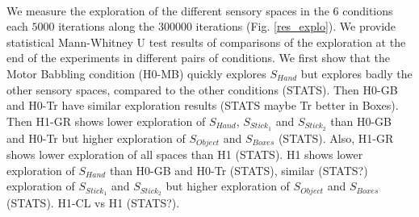 \documentclass[10pt,letterpaper]{article}
\begin{document}
	\paragraph{}
	We measure the exploration of the different sensory spaces in the $6$ conditions each $5000$ iterations along the $300000$ iterations (Fig. \ref{res_explo}).
	We provide statistical Mann-Whitney U test results of comparisons of the exploration at the end of the experiments in different pairs of conditions.
	We first show that the Motor Babbling condition (H0-MB) quickly explores $S_{Hand}$ but explores badly the other sensory spaces, compared to the other conditions (STATS).
	Then H0-GB and H0-Tr have similar exploration results (STATS maybe Tr better in Boxes).
	Then H1-GR shows lower exploration of $S_{Hand}$, $S_{Stick_1}$ and $S_{Stick_2}$ than H0-GB and H0-Tr but higher exploration of $S_{Object}$ and $S_{Boxes}$ (STATS).
	Also, H1-GR shows lower exploration of all spaces than H1 (STATS).
	H1 shows lower exploration of $S_{Hand}$ than H0-GB and H0-Tr (STATS), similar (STATS?) exploration of $S_{Stick_1}$ and $S_{Stick_2}$ but higher exploration of $S_{Object}$ and $S_{Boxes}$ (STATS).
	H1-CL vs H1 (STATS?).
	
\end{document}

